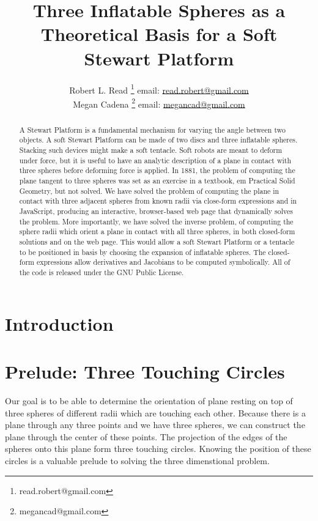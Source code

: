 \documentclass{article}
\title{Three Inflatable Spheres as a Theoretical Basis for a Soft Stewart Platform}
\author{Robert L. Read
  \thanks{read.robert@gmail.com}
  email: \href{mailto:read.robert@gmail.com}{read.robert@gmail.com}\\
Megan Cadena
  \thanks{megancad@gmail.com}
  email: \href{mailto:megancad@gmail.com}{megancad@gmail.com}
  }
\begin{document}
\maketitle
\begin{abstract}
  A Stewart Platform\cite{wiki:stewart} is a fundamental mechanism for varying the angle
  between two objects.
  A soft Stewart Platform can be made of two discs and
  three inflatable spheres.
  Stacking such devices might make a soft tentacle.
  Soft robots are meant to deform under force, but it is useful to have
  an analytic description of a plane in contact with three spheres
  before deforming force is applied.
  In 1881, the problem of computing the plane tangent to three spheres was
  set as an exercise in a textbook, {em Practical Solid Geometry}\cite{payne1881},
  but not solved.
  We have solved the problem of computing the plane in contact with
  three adjacent spheres from known radii via close-form expressions and
  in JavaScript, producing an interactive,
  browser-based web page that dynamically solves the problem\cite{softrobotcalc}.
  More importantly, we have solved the inverse problem, of computing the
  sphere radii which orient a plane in contact with all three spheres, in
  both closed-form solutions and on the web page.
  This would allow a soft Stewart Platform or a tentacle to be positioned
  in basis by choosing the expansion of inflatable spheres.
  The closed-form expressions allow derivatives and Jacobians to be computed
  symbolically.
  All of the code is released under the GNU Public License.
\end{abstract}


\section{Introduction}

\section{Prelude: Three Touching Circles}

Our goal is to be able to determine the orientation of plane resting
on top of three spheres of different radii which are touching each
other.
Because there is a plane through any three points and we have three spheres, we can construct the plane through
the center of these points.
The projection of the edges of the spheres onto this plane form three touching circles.
Knowing the position of these circles is a valuable prelude to solving the three dimenstional problem.
\end{document}
